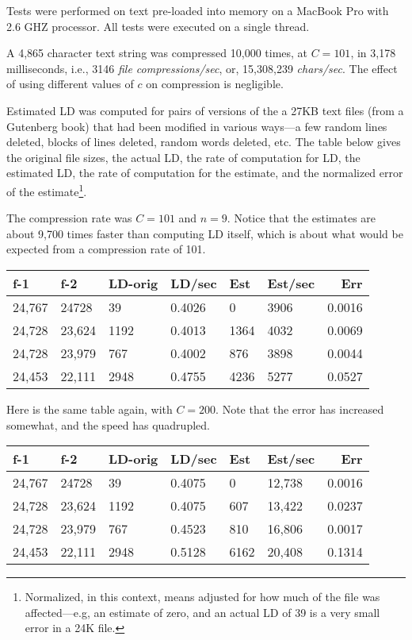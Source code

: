 \documentclass[html]{article}    %
\begin{document}
Tests were performed on text pre-loaded into memory on a MacBook Pro with 2.6 GHZ processor. 
All tests were executed on a single thread. 

A 4,865 character text string was compressed 10,000 times, at $C=101$, in 3,178 milliseconds, i.e., 3146 {\em file compressions/sec},
or, 15,308,239 {\em chars/sec}.  The effect of using different values of $c$ on compression is negligible.

Estimated LD was computed for pairs of versions of the a 27KB text files (from a Gutenberg book) that had been modified in 
various ways---a few random lines deleted, blocks of lines deleted, random words deleted, etc. 
The table below gives the original file sizes, the actual LD, the rate  of computation for LD,  the estimated LD, 
the rate of computation for the estimate, and the normalized error of the estimate\footnote{ 
	Normalized, in this context, means adjusted for how much of the file was affected---e.g, an estimate of zero, 
	and an actual LD of 39 is a very small error in a 24K file.
}.
\vspace {10 mm}

The compression rate was $C=101$ and $n=9$. Notice that the estimates are about 9,700 times faster than computing LD itself,
which is about what would be expected from a compression rate of 101.

\vspace {10 mm}
\begin {tabular} {|l|l|l|l|l|l|r|} \hline \hline
 f-1  		& f-2 		& LD-orig	&LD/sec		& Est 		& Est/sec	 & Err  	\\ \hline
 \hline
 24,767 	& 24728  	& 39  		& 0.4026	& 0  	 	& 3906 	 	& 0.0016 	\\ \hline
 24,728 	& 23,624  	& 1192  	& 0.4013	& 1364   	& 4032 	 	& 0.0069 	\\ \hline
 24,728 	& 23,979  	& 767  		& 0.4002	& 876   	& 3898 	 	& 0.0044 	\\ \hline
 24,453 	& 22,111  	& 2948  	& 0.4755	& 4236   	& 5277 	 	& 0.0527 	\\ \hline
\end {tabular}
\vspace {10 mm}


Here is the same table again, with $C=200$.
Note that the error has increased somewhat,  and the speed has quadrupled.

\vspace {10 mm}
\begin {tabular} {|l|l|l|l|l|l|r|} \hline \hline
 f-1  		& f-2 		& LD-orig	&LD/sec		& Est 		& Est/sec	 & Err  	\\ \hline
 \hline
 24,767 	& 24728  	& 39  		& 0.4075	& 0  	 	& 12,738 	 	& 0.0016 	\\ \hline
 24,728 	& 23,624  	& 1192  	& 0.4075	& 607   	& 13,422 	 	& 0.0237 	\\ \hline
 24,728 	& 23,979  	& 767  		& 0.4523	& 810   	& 16,806 	 	& 0.0017 	\\ \hline
 24,453 	& 22,111  	& 2948  	& 0.5128	& 6162   	& 20,408 	 	& 0.1314 	\\ \hline
\end {tabular}
\vspace {10 mm}
\end{document}
